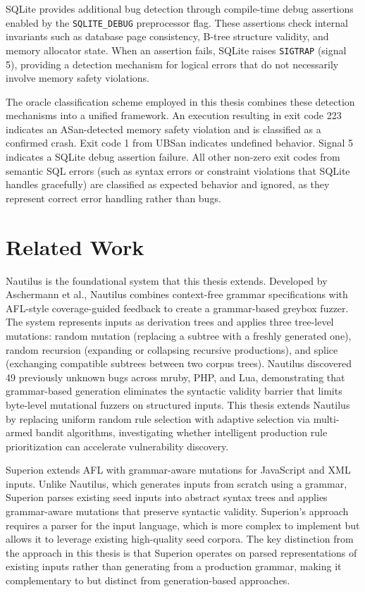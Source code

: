 SQLite provides additional bug detection through compile-time debug assertions enabled by the \texttt{SQLITE\_DEBUG} preprocessor flag. These assertions check internal invariants such as database page consistency, B-tree structure validity, and memory allocator state. When an assertion fails, SQLite raises \texttt{SIGTRAP} (signal 5), providing a detection mechanism for logical errors that do not necessarily involve memory safety violations.

The oracle classification scheme employed in this thesis combines these detection mechanisms into a unified framework. An execution resulting in exit code 223 indicates an ASan-detected memory safety violation and is classified as a confirmed crash. Exit code 1 from UBSan indicates undefined behavior. Signal 5 indicates a SQLite debug assertion failure. All other non-zero exit codes from semantic SQL errors (such as syntax errors or constraint violations that SQLite handles gracefully) are classified as expected behavior and ignored, as they represent correct error handling rather than bugs.

\section{Related Work}
\label{sec:bg-related}

Nautilus \cite{nautilus} is the foundational system that this thesis extends. Developed by Aschermann et al., Nautilus combines context-free grammar specifications with AFL-style coverage-guided feedback to create a grammar-based greybox fuzzer. The system represents inputs as derivation trees and applies three tree-level mutations: random mutation (replacing a subtree with a freshly generated one), random recursion (expanding or collapsing recursive productions), and splice (exchanging compatible subtrees between two corpus trees). Nautilus discovered 49 previously unknown bugs across mruby, PHP, and Lua, demonstrating that grammar-based generation eliminates the syntactic validity barrier that limits byte-level mutational fuzzers on structured inputs. This thesis extends Nautilus by replacing uniform random rule selection with adaptive selection via multi-armed bandit algorithms, investigating whether intelligent production rule prioritization can accelerate vulnerability discovery.

Superion \cite{superion} extends AFL with grammar-aware mutations for JavaScript and XML inputs. Unlike Nautilus, which generates inputs from scratch using a grammar, Superion parses existing seed inputs into abstract syntax trees and applies grammar-aware mutations that preserve syntactic validity. Superion's approach requires a parser for the input language, which is more complex to implement but allows it to leverage existing high-quality seed corpora. The key distinction from the approach in this thesis is that Superion operates on parsed representations of existing inputs rather than generating from a production grammar, making it complementary to but distinct from generation-based approaches.

